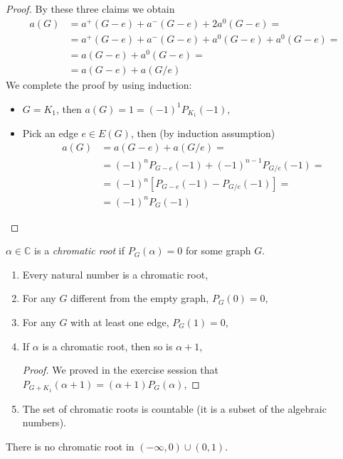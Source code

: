 \begin{proof}
By these three claims we obtain
\begin{align*}
a(G)&=a^+(G-e)+a^-(G-e)+2a^0(G-e)= \\
&= a^+(G-e)+a^-(G-e)+a^0(G-e)+a^0(G-e)= \\
&= a(G-e)+a^0(G-e)= \\
&= a(G-e)+a(G/e)
\end{align*}
We complete the proof by using induction:
\begin{itemize}
\item $G=K_1$, then $a(G)=1=(-1)^1P_{K_1}(-1)$,
\item Pick an edge $e\in E(G)$, then (by induction assumption)
\begin{align*}
a(G)&=a(G-e)+a(G/e)= \\
&= (-1)^nP_{G-e}(-1)+(-1)^{n-1}P_{G/e}(-1)= \\
&= (-1)^n[P_{G-e}(-1)-P_{G/e}(-1)]= \\
&= (-1)^nP_G(-1)
\end{align*}
\end{itemize}
\end{proof}

\begin{definition} $\alpha \in \mathbb{C}$ is a \emph{chromatic root} if $P_G(\alpha)=0$ for some graph $G$.
\end{definition}

\begin{observation}
\begin{enumerate}
\item Every natural number is a chromatic root,
\item For any $G$ different from the empty graph, $P_G(0)=0$,
\item For any $G$ with at least one edge, $P_G(1)=0$,
\item If $\alpha$ is a chromatic root, then so is $\alpha+1$,
\begin{proof}
We proved in the exercise session that $P_{G+K_1}(\alpha+1)=(\alpha+1)P_G(\alpha)$,
\end{proof}
\item The set of chromatic roots is countable (it is a subset of the algebraic numbers).
\end{enumerate}
\end{observation}



\begin{proposition} There is no chromatic root in $(- \infty, 0)\cup (0,1)$.
\end{proposition}

